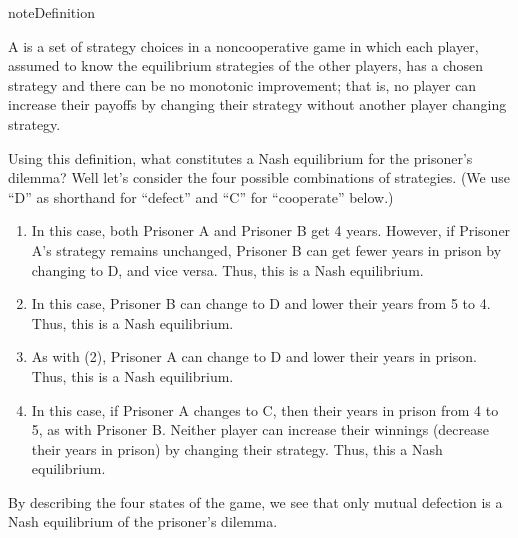 \documentclass[letterpaper,10pt,english]{jupyterBook}
\begin{document}
\begin{sphinxadmonition}{note}{Definition}

\sphinxAtStartPar
A  is a set of strategy choices in a non\sphinxhyphen{}cooperative game in which each player, assumed to know the equilibrium strategies of the other players, has a chosen strategy and there can be no monotonic improvement; that is, no player can increase their payoffs by changing their strategy without another player changing  strategy.
\end{sphinxadmonition}

\sphinxAtStartPar
Using this definition, what constitutes a Nash equilibrium for the prisoner’s dilemma? Well let’s consider the four possible combinations of strategies. (We use “D” as shorthand for “defect” and “C” for “cooperate” below.)
\begin{enumerate}
%
\item {} 
\sphinxAtStartPar
{} In this case, both Prisoner A and Prisoner B get 4 years. However, if Prisoner A’s strategy remains unchanged, Prisoner B can get fewer years in prison by changing to D, and vice versa. Thus, this is  a Nash equilibrium.

\item {} 
\sphinxAtStartPar
{} In this case, Prisoner B can change to D and lower their years from 5 to 4. Thus, this is  a Nash equilibrium.

\item {} 
\sphinxAtStartPar
{} As with (2), Prisoner A can change to D and lower their years in prison. Thus, this is  a Nash equilibrium.

\item {} 
\sphinxAtStartPar
{} In this case, if Prisoner A changes to C, then their years in prison  from 4 to 5, as with Prisoner B. Neither player can increase their winnings (decrease their years in prison) by changing their strategy. Thus, this  a Nash equilibrium.

\end{enumerate}

\sphinxAtStartPar
By describing the four states of the game, we see that only mutual defection is a Nash equilibrium of the prisoner’s dilemma.
\end{document}
